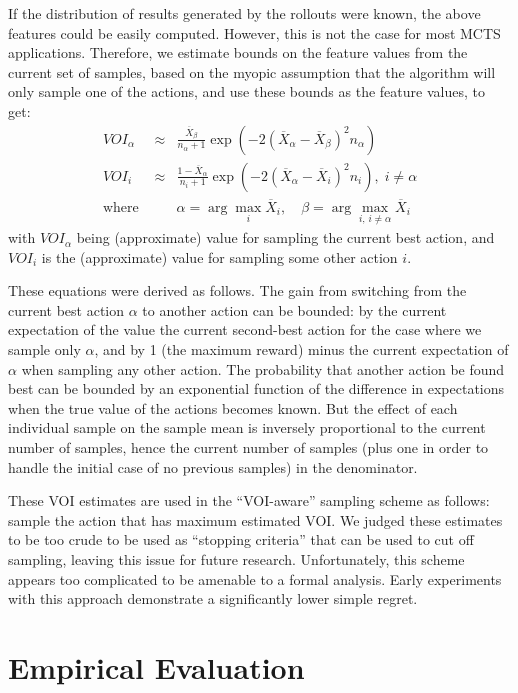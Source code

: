 \documentclass[letterpaper]{article}
\begin{document}
If the distribution of results generated by the rollouts were known, the
above features could be easily computed. However, this is not the case for
most MCTS applications. Therefore, we estimate bounds on the feature values from
the current set of samples, based on the myopic assumption that the algorithm will only
sample one of the actions, and use these bounds as the feature values, to get:
\begin{eqnarray}
VOI_\alpha&\approx&\frac {\overline X_\beta} {n_\alpha+1}
\exp\left(-2(\overline X_\alpha - \overline X_\beta)^2 n_\alpha\right)\\
VOI_i&\approx&\frac {1-\overline X_\alpha} {n_i+1}
\exp\left(-2(\overline X_\alpha - \overline X_i)^2 n_i\right),\; i\ne\alpha\nonumber\\
\mbox{where }&&\alpha=\arg\max_i \overline X_i,\quad
             \beta=\arg\max_{i,\,i\ne\alpha} \overline X_i\nonumber
\end{eqnarray}
with $VOI_{\alpha}$ being (approximate) value for sampling the current best action,
and $VOI_i$ is the (approximate) value for sampling some other action $i$. 

These equations were derived as follows. The gain from switching from the current best action $\alpha$ to another
action can be bounded:  by  the current expectation of the value the current second-best action
for the case where we sample only $\alpha$, and by 1 (the maximum reward) minus the current expectation
of $\alpha $ when sampling any other action. 
The probability that another action be found
best can be bounded by an exponential function of the difference in expectations when the true value
of the actions becomes known. But the effect of each individual sample on the sample mean
is inversely proportional to the current number of samples, hence the current number of samples (plus one
in order to handle the initial case of no previous samples) in the denominator.

These VOI estimates are used in the ``VOI-aware'' sampling scheme as follows: sample the
action that has maximum estimated VOI. We judged these estimates to be too crude
to be used as ``stopping criteria'' that can be used to cut off sampling,
leaving this issue for future research.
Unfortunately, this scheme appears too complicated to be amenable to a formal
analysis. Early experiments with this approach demonstrate a significantly lower simple regret.

\section{Empirical Evaluation}
\label{sec:emp}
\end{document}
